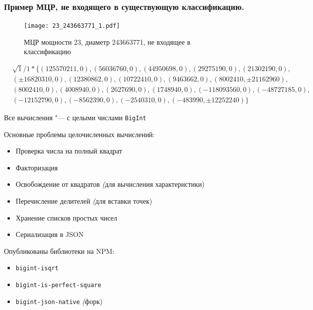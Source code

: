 \documentclass[10pt,pdf,hyperref={unicode},aspectratio=169]{beamer}
\theoremstyle{definition}
\begin{document}
\begin{frame}
    \frametitle{Пример  МЦР, не входящего в существующую классификацию.}

    \begin{figure}[h!]
    	\centering
    	\texttt{[image: 23\_243663771\_1.pdf]}
    	\caption{МЦР мощности 23, диаметр 243663771, не входящее в классификацию}
    \end{figure}

    \begin{align*}
    	&\sqrt 1/1 * \{(125570211, 0),
    	(56036760, 0),
    	(44950698, 0),
    	(29275190, 0),
    	(21302190, 0), \\
    	&(\pm 16820310, 0),
    	(12380862, 0),
    	(10722410, 0),
    	(9463662, 0),
    	(8002410, \pm 21162960), \\
    	&(8002410, 0),
    	(4008940, 0),
    	(2627690, 0),
    	(1748940, 0),
    	(-118093560, 0),
    	(-48727185, 0), \\
    	&(-12152790, 0),
    	(-8562390, 0),
    	(-2540310, 0),
    	(-483990, \pm 12252240)
    	\}
    \end{align*}

\end{frame}

\begin{frame}
	Все вычисления "--- с целыми числами \texttt{BigInt}

	\vfill


	Основные проблемы целочисленных вычислений:

	\begin{itemize}
		\item
			Проверка числа на полный квадрат
		\item
			Факторизация
		\item
			Освобождение от квадратов \textit(для вычисления характеристики)
		\item
			Перечисление делителей \textit(для вставки точек)
		\item
			Хранение списков простых чисел
		\item
			Сериализация в JSON
	\end{itemize}

	Опубликованы библиотеки на NPM:

	\begin{itemize}
		\item
			\texttt{bigint-isqrt}
		\item
			\texttt{bigint-is-perfect-square}
		\item
			\texttt{bigint-json-native} \textit(форк)
	\end{itemize}



\end{frame}
\end{document}
